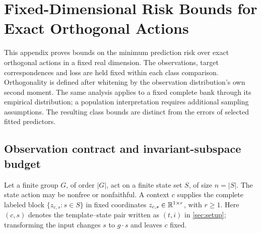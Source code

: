 \section{Fixed-Dimensional Risk Bounds for Exact Orthogonal Actions}
\label{app:spectral-risk}

This appendix proves bounds on the minimum prediction risk over exact orthogonal actions in a fixed real dimension. The observations, target correspondences and loss are held fixed within each class comparison. Orthogonality is defined after whitening by the observation distribution's own second moment. The same analysis applies to a fixed complete bank through its empirical distribution; a population interpretation requires additional sampling assumptions. The resulting class bounds are distinct from the errors of selected fitted predictors.

\subsection{Observation contract and invariant-subspace budget}
\label{sp:setup}
Let a finite group $G$, of order $|G|$, act on a finite state set $S$, of size $n=|S|$. The state action may be nonfree or nonfaithful. A context $c$ supplies the complete labeled block $\{z_{c,s}:s\in S\}$ in fixed coordinates $z_{c,s}\in\mathbb{R}^{1\times r}$, with $r\ge1$. Here $(c,s)$ denotes the template--state pair written as $(t,i)$ in \cref{sec:setup}; transforming the input changes $s$ to $g\cdot s$ and leaves $c$ fixed.

